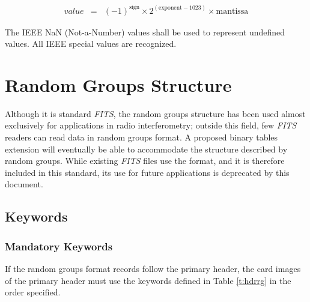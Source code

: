        \begin{eqnarray}  
          value & = & (-1)^{\mbox{sign}}   \times 
                      2^{(\mbox{exponent}-1023)} \times
                      \mbox{mantissa}
       \end{eqnarray}  

       The IEEE NaN (Not-a-Number) values 
       shall be used to represent undefined values.  All 
       IEEE special values are recognized.
  
\chapter{Random Groups Structure}
    \label{s:Rgrp}

  
Although it is standard {\em FITS}, the random groups 
structure
has been used almost exclusively for applications in
radio
interferometry; outside this field, few {\em FITS\/} readers can read 
data in random groups format.  A proposed binary 
tables extension will eventually
be able to accommodate the structure described by random groups. While
existing {\em FITS\/} files use the format, and it is therefore 
included in this standard, its use for future applications is 
deprecated by this document.
  
\section{Keywords}
  \subsection{Mandatory Keywords}
   If the random groups format records follow the 
   primary header, the card \label{s:rangr} 
   images of the primary header must use the keywords 
   defined in Table \ref{t:hdrrg} in the 
   order
   specified. 
  
